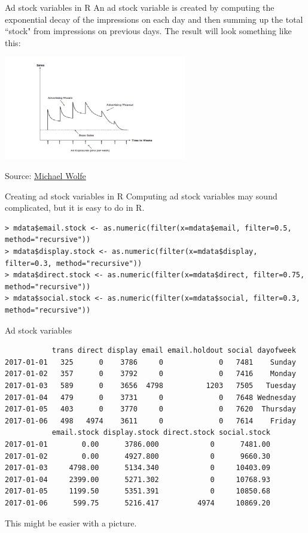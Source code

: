 \documentclass[10pt, aspectratio=169]{beamer}
\newcommand{\source}[1]{\begin{flushright} \footnotesize Source: {#1} \end{flushright} \normalsize}
\begin{document}
\begin{frame}{Ad stock variables in R}
An ad stock variable is created by computing the exponential decay of the impressions on each day and then summing up the total ``stock" from impressions on previous days. The result will look something like this: \\
\begin{center}
\includegraphics[width=0.6\textwidth]{images/adresponseovertime.png}
\source{\href{https://www.linkedin.com/pulse/new-tools-determining-measuring-wear-in-wear-out-media-michael-wolfe}{Michael Wolfe}}
\end{center} 
\end{frame}

\begin{frame}[fragile]{Creating ad stock variables in R}
Computing ad stock variables may sound complicated, but it is easy to do in R. 
\footnotesize
\begin{lstlisting}[basicstyle=\tiny\ttfamily]
> mdata$email.stock <- as.numeric(filter(x=mdata$email, filter=0.5, method="recursive"))
> mdata$display.stock <- as.numeric(filter(x=mdata$display, filter=0.3, method="recursive"))
> mdata$direct.stock <- as.numeric(filter(x=mdata$direct, filter=0.75, method="recursive"))
> mdata$social.stock <- as.numeric(filter(x=mdata$social, filter=0.3, method="recursive"))
\end{lstlisting}
\end{frame}

\begin{frame}[fragile]{Ad stock variables} 
\begin{lstlisting}
           trans direct display email email.holdout social dayofweek
2017-01-01   325      0    3786     0             0   7481    Sunday
2017-01-02   357      0    3792     0             0   7416    Monday
2017-01-03   589      0    3656  4798          1203   7505   Tuesday
2017-01-04   479      0    3731     0             0   7648 Wednesday
2017-01-05   403      0    3770     0             0   7620  Thursday
2017-01-06   498   4974    3611     0             0   7614    Friday
           email.stock display.stock direct.stock social.stock
2017-01-01        0.00      3786.000            0      7481.00
2017-01-02        0.00      4927.800            0      9660.30
2017-01-03     4798.00      5134.340            0     10403.09
2017-01-04     2399.00      5271.302            0     10768.93
2017-01-05     1199.50      5351.391            0     10850.68
2017-01-06      599.75      5216.417         4974     10869.20
\end{lstlisting}
\begin{center}
\alert{This might be easier with a picture.}
\end{center}
\end{frame}
\end{document}
